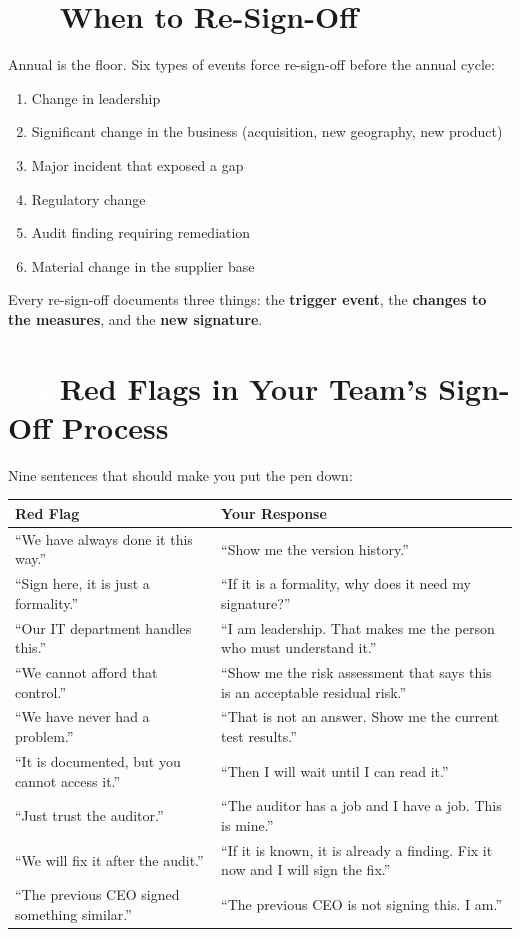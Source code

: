 \documentclass[11pt,a4paper,twoside]{book}
\newcommand{\lessontag}[1]{%
  \texorpdfstring{%
    \setlength{\fboxsep}{3pt}\colorbox{nisd2blue}{\textcolor{white}{\footnotesize\bfseries #1}}\quad%
  }{Lesson #1\ }%
}
\begin{document}
\section{\lessontag{3.3}When to Re-Sign-Off}

Annual is the floor. Six types of events force re-sign-off before the annual cycle:

\begin{enumerate}
  \item Change in leadership
  \item Significant change in the business (acquisition, new geography, new product)
  \item Major incident that exposed a gap
  \item Regulatory change
  \item Audit finding requiring remediation
  \item Material change in the supplier base
\end{enumerate}

Every re-sign-off documents three things: the \textbf{trigger event}, the \textbf{changes to the measures}, and the \textbf{new signature}.

\section{\lessontag{3.4}Red Flags in Your Team's Sign-Off Process}

Nine sentences that should make you put the pen down:

\begin{center}
\renewcommand{\arraystretch}{1.3}
\begin{tabularx}{\linewidth}{@{}X X@{}}
\toprule
\textbf{Red Flag} & \textbf{Your Response} \\
\midrule
``We have always done it this way.'' & ``Show me the version history.'' \\
``Sign here, it is just a formality.'' & ``If it is a formality, why does it need my signature?'' \\
``Our IT department handles this.'' & ``I am leadership. That makes me the person who must understand it.'' \\
``We cannot afford that control.'' & ``Show me the risk assessment that says this is an acceptable residual risk.'' \\
``We have never had a problem.'' & ``That is not an answer. Show me the current test results.'' \\
``It is documented, but you cannot access it.'' & ``Then I will wait until I can read it.'' \\
``Just trust the auditor.'' & ``The auditor has a job and I have a job. This is mine.'' \\
``We will fix it after the audit.'' & ``If it is known, it is already a finding. Fix it now and I will sign the fix.'' \\
``The previous CEO signed something similar.'' & ``The previous CEO is not signing this. I am.'' \\
\bottomrule
\end{tabularx}
\end{center}
\end{document}
